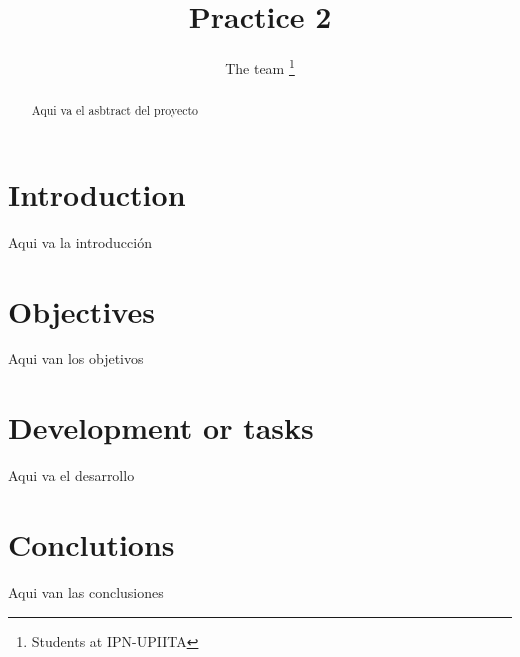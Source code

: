 \documentclass{IEEEtran}
\title{Practice 2}
\author{The team \thanks{Students at IPN-UPIITA}}
\begin{document}
	\begin{abstract}
		Aqui va el asbtract del proyecto
	\end{abstract}
	\section{Introduction}\label{Intro}
		Aqui va la introducción 
	\section{Objectives}
		Aqui van los objetivos
	\section{Development or tasks}
		Aqui va el desarrollo
	\section{Conclutions}
		Aqui van las conclusiones
		
%
\end{document}
